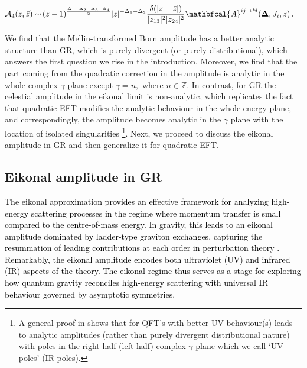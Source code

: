 \begin{align}\begin{split}
\centering\label{4.18m}
  \mathcal{A}_4(z,\bar z)\sim\,&  (z-1)^{\frac{\Delta_1-\Delta_2-\Delta_3+\Delta_4}{2}}|z|^{-\Delta_1-\Delta_2}\frac{\delta(|z-\bar z|)}{|z_{13}|^2|z_{24}|^2}\mathbfcal{A}^{ij\to kl}(\mathbf{\Delta},J_i,z)\,.
 \end{split} 
\end{align}

We find that the Mellin-transformed Born amplitude has a better analytic structure than GR, which is purely divergent (or purely distributional), which answers the first question we rise in the introduction. Moreover, we find that the part coming from the quadratic correction in the amplitude is analytic in the whole complex $\gamma$-plane except $\gamma=n,$ where $n\in \mathbb{Z}$. In contrast, for GR the celestial amplitude in the eikonal limit is non-analytic, which replicates the fact that quadratic EFT modifies the analytic behaviour in the whole energy plane, and correspondingly, the amplitude becomes analytic in the $\gamma$ plane with the location of isolated singularities \footnote{ A general proof in \cite{Arkani-Hamed:2020gyp} shows that for QFT's with better UV behaviour(s) leads to analytic amplitudes (rather than purely divergent distributional nature) with poles in the right-half (left-half) complex $\gamma$-plane which we call `UV poles' (IR poles). }.
Next, we proceed to discuss the eikonal amplitude in GR and then generalize it for quadratic EFT.



\noindent
\subsection{Eikonal amplitude in GR} 

\textcolor{black}{The eikonal approximation provides an effective framework for analyzing high-energy scattering processes in the regime where momentum transfer is small compared to the centre-of-mass energy. In gravity, this leads to an eikonal amplitude dominated by ladder-type graviton exchanges, capturing the resummation of leading contributions at each order in perturbation theory \cite{Amati:1987uf,Kabat:1992tb}. Remarkably, the eikonal amplitude encodes both ultraviolet (UV) and infrared (IR) aspects of the theory. The eikonal regime thus serves as a stage for exploring how quantum gravity reconciles high-energy scattering with universal IR behaviour governed by asymptotic symmetries.
}\par

